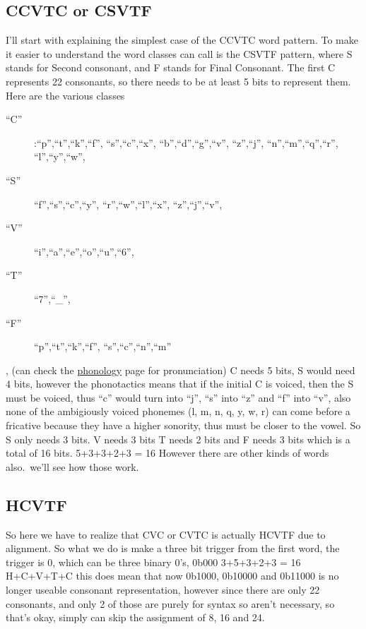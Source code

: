 \subsection{CCVTC or CSVTF}\label{ccvtc-or-csvtf}

I'll start with explaining the simplest case of the CCVTC word pattern.
To make it easier to understand the word classes can call is the CSVTF
pattern, where S stands for Second consonant, and F stands for Final
Consonant. The first C represents 22 consonants, so there needs to be at
least 5 bits to represent them. Here are the various classes
\begin{description}
\item[``C'']:``p'',``t'',``k'',``f'', ``s'',``c'',``x'',
``b'',``d'',``g'',``v'', ``z'',``j'', ``n'',``m'',``q'',``r'',
``l'',``y'',``w'', 
\item[``S'']``f'',``s'',``c'',``y'', ``r'',``w'',``l'',``x'', ``z'',``j'',``v'',
\item[``V'']``i'',``a'',``e'',``o'',``u'',``6'',
\item[``T'']``7'',``\_'', 
\item[``F'']``p'',``t'',``k'',``f'',
``s'',``c'',``n'',``m''
\end{description}
, (can check the
\href{http://wyn.bot.nu/spel/src/vocab/gen/phonology.html}{phonology}
page for pronunciation) C needs 5 bits, S would need 4 bits, however the
phonotactics means that if the initial C is voiced, then the S must be
voiced, thus ``c'' would turn into ``j'', ``s'' into ``z'' and ``f''
into ``v'', also none of the ambigiously voiced phonemes (l, m, n, q, y,
w, r) can come before a fricative because they have a higher sonority,
thus must be closer to the vowel. So S only needs 3 bits. V needs 3 bits
T needs 2 bits and F needs 3 bits which is a total of 16 bits. 5+3+3+2+3
= 16 However there are other kinds of words also.\ we'll see how those
work.

\subsection{HCVTF}\label{hcvtf}

So here we have to realize that CVC or CVTC is actually HCVTF due to
alignment. So what we do is make a three bit trigger from the first
word, the trigger is 0, which can be three binary 0's, 0b000 3+5+3+2+3 =
16 H+C+V+T+C this does mean that now 0b1000, 0b10000 and 0b11000 is no
longer useable consonant representation, however since there are only 22
consonants, and only 2 of those are purely for syntax so aren't
necessary, so that's okay, simply can skip the assignment of 8, 16 and
24.

